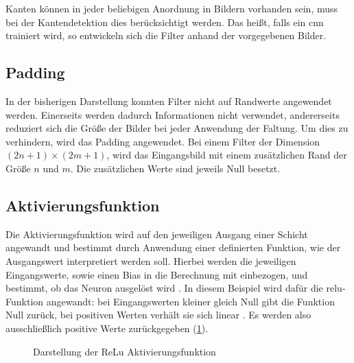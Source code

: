 Kanten können in jeder beliebigen Anordnung in Bildern vorhanden sein, muss bei der Kantendetektion dies berücksichtigt werden. Das heißt, falls ein \ac{cnn} trainiert wird, so entwickeln sich die Filter anhand der vorgegebenen Bilder. 



\subsection{Padding}

In der bisherigen Darstellung konnten Filter nicht auf Randwerte angewendet werden. Einerseits werden dadurch Informationen nicht verwendet, andererseits reduziert sich die Größe der Bilder bei jeder Anwendung der Faltung. Um dies zu verhindern, wird das Padding angewendet. Bei einem Filter der Dimension $(2n+1) \times (2m+1)$, wird das Eingangsbild mit einem zusätzlichen Rand der Größe
$n$ und $m$. Die zusätzlichen Werte sind jeweils Null besetzt.



\subsection{Aktivierungsfunktion}\label{subsec:activation}

Die Aktivierungsfunktion wird auf den jeweiligen Ausgang einer Schicht angewandt und bestimmt durch Anwendung einer definierten Funktion, wie der Ausgangswert interpretiert werden soll. Hierbei werden die jeweiligen Eingangswerte, sowie einen Bias in die Berechnung mit einbezogen, und bestimmt, ob das Neuron ausgelöst wird \cite{Nwankpa:2018}. In diesem Beispiel wird dafür die \ac{relu}-Funktion angewandt: bei Eingangswerten kleiner gleich Null gibt die Funktion Null zurück, bei positiven Werten verhält sie sich linear \cite{Agarap:2018}. Es werden also ausschließlich positive Werte zurückgegeben (\cref{fig:relu}).

\begin{figure}
    \centering
    \caption{Darstellung der ReLu Aktivierungsfunktion}
    \label{fig:relu}
\end{figure}

